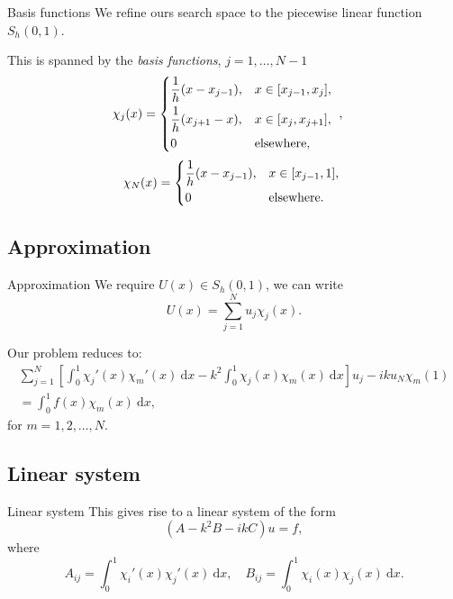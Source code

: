 \documentclass[]{beamer}
\newcommand{\dd}{\mathrm{d}}
\begin{document}
\begin{frame}{Basis functions}
We refine ours search space to the piecewise linear function $S_h(0, 1)$.

This is spanned by the \emph{basis functions}, $j = 1, \ldots, N - 1$
\begin{equation*}
  \chi_j(x) = \begin{dcases*}
    \frac{1}{h} (x - x_{j - 1}), & $x \in [x_{j - 1}, x_j],$ \\
    \frac{1}{h} (x_{j + 1} - x), & $x \in [x_{j}, x_{j + 1}],$ \\
    0 & elsewhere,
  \end{dcases*}, \quad
\end{equation*}
\begin{equation*}
  \chi_N(x) = \begin{dcases*}
    \frac{1}{h} (x - x_{j - 1}), & $x \in [x_{j - 1}, 1],$ \\
    0 & elsewhere.
  \end{dcases*}
\end{equation*}
\end{frame}

\subsection{Approximation}

\begin{frame}{Approximation}
  We require $U(x) \in S_h(0, 1)$, we can write
  \begin{equation*}
    U(x) = \sum_{j = 1}^N u_j \chi_j(x).
  \end{equation*}

  Our problem reduces to:
\begin{equation*} \label{eq:linsys}
  \begin{split}
  \sum^N_{j = 1} \left[ \int^1_0 \chi_j'(x) \chi_m'(x) \ \dd x
    - k^2 \int^1_0 \chi_j(x) \chi_m(x) \ \dd x \right] u_j
    - i k u_N \chi_m(1)
 \\ =
    \int^1_0 f(x) \chi_m(x) \ \dd x,
    \end{split}
\end{equation*}
for $m = 1, 2, \ldots, N$.
\end{frame}

\subsection{Linear system}

\begin{frame}{Linear system}
  This gives rise to a linear system of the form
  \begin{equation*}
    (A - k^2 B - i k C)u = f,
  \end{equation*}
  where
\begin{equation*}
  A_{i j} = \int^1_0 \chi_i'(x) \chi_j'(x) \ \dd x, \quad
  B_{i j} = \int^1_0 \chi_i(x) \chi_j(x) \ \dd x.
\end{equation*}
\end{frame}
\end{document}
